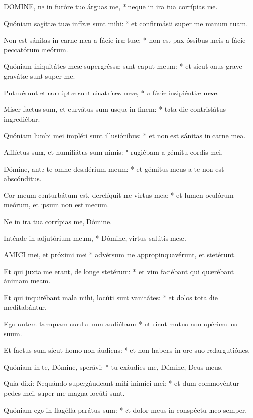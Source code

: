 
\lettrine[lines=2]{D}{OMINE}, ne in furóre tuo árguas me, * neque in ira tua corrípias me.

Quóniam sagíttæ tuæ infíxæ sunt mihi: * et confirmásti super me manum tuam.

Non est sánitas in carne mea a fácie iræ tuæ: * non est pax óssibus meis a fácie peccatórum meórum.

Quóniam iniquitátes meæ supergréssæ sunt caput meum: * et sicut onus grave gravátæ sunt super me.

Putruérunt et corrúptæ sunt cicatríces meæ, * a fácie insipiéntiæ meæ.

Miser factus sum, et curvátus sum usque in finem: * tota die contristátus ingrediébar.

Quóniam lumbi mei impléti sunt illusiónibus: * et non est sánitas in carne mea.

Afflíctus sum, et humiliátus sum nimis: * rugiébam a gémitu cordis mei.

Dómine, ante te omne desidérium meum: * et gémitus meus a te non est abscónditus.

Cor meum conturbátum est, derelíquit me virtus mea: * et lumen oculórum meórum, et ipsum non est mecum.

 Ne in ira tua corrípias me, Dómine.

 Inténde in adjutórium meum, * Dómine, virtus salútis meæ.


\lettrine[lines=2]{A}{MICI} mei, et próximi mei * advérsum me appropinquavérunt, et stetérunt.

Et qui juxta me erant, de longe stetérunt: * et vim faciébant qui quærébant ánimam meam.

Et qui inquirébant mala mihi, locúti sunt vanitátes: * et dolos tota die meditabántur.

Ego autem tamquam surdus non audiébam: * et sicut mutus non apériens os suum.

Et factus sum sicut homo non áudiens: * et non habens in ore suo redargutiónes.

Quóniam in te, Dómine, sperávi: * tu exáudies me, Dómine, Deus meus.

Quia dixi: Nequándo supergáudeant mihi inimíci mei: * et dum commovéntur pedes mei, super me magna locúti sunt.

Quóniam ego in flagélla parátus sum: * et dolor meus in conspéctu meo semper.


